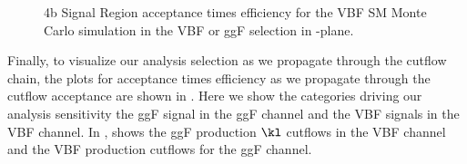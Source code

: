 \begin{figure}[h]
	\centering
	\caption{4b Signal Region acceptance times efficiency for the VBF SM Monte Carlo simulation in the VBF or ggF selection in \kvv-\kl plane.}
	\label{fig:eff-2d}
\end{figure}

Finally, to visualize our analysis selection as we propagate through the cutflow chain, the plots for acceptance times efficiency as we propagate through the cutflow acceptance are shown in \Fig{\ref{fig:accXeff-cutflow}}. Here we show the categories driving our analysis sensitivity the ggF signal in the ggF channel and the VBF signals in the VBF channel.  In \App{\ref{app:evt-sel}}, \Fig{\ref{fig:accXeff-cutflow-app}} shows the ggF production $\kl$ cutflows in the VBF channel and the VBF production cutflows for the ggF channel.

